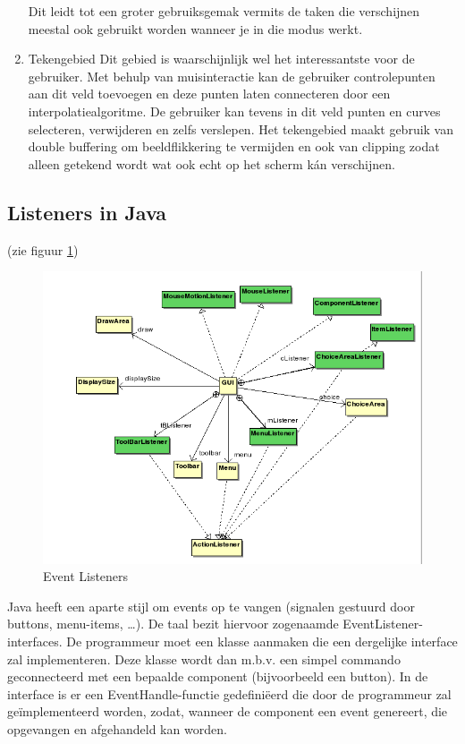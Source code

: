 \documentclass[a4paper,11pt,oneside, titlepage]{article}
\begin{document}
\begin{enumerate}
Dit leidt tot een groter gebruiksgemak vermits de taken die verschijnen meestal ook gebruikt
worden wanneer je in die modus werkt.
\item Tekengebied\newline
Dit gebied is waarschijnlijk wel het interessantste voor de gebruiker. Met behulp van muisinteractie
kan de gebruiker controlepunten aan dit veld toevoegen en deze punten laten connecteren
door een interpolatiealgoritme. De gebruiker kan tevens in dit veld punten en curves selecteren,
verwijderen en zelfs verslepen. Het tekengebied maakt gebruik van double buffering om 
beeldflikkering te vermijden en ook van clipping zodat alleen getekend wordt wat ook echt
op het scherm k\'an verschijnen.
\end{enumerate}
\subsection{Listeners in Java }
(zie figuur \ref{iLis})
\begin{figure}[htbp]
\centering
\includegraphics[scale=0.4]{./UML2/Listeners.png}
\caption{Event Listeners}\label{iLis}
\end{figure}
Java heeft een aparte stijl om events op te vangen (signalen gestuurd door buttons, menu-items,
\ldots). De taal bezit hiervoor zogenaamde EventListener-interfaces. De programmeur
moet een klasse aanmaken die een dergelijke interface zal implementeren. Deze klasse wordt dan
m.b.v. een simpel commando geconnecteerd met een bepaalde component (bijvoorbeeld een button).
In de interface is er een EventHandle-functie gedefini\"eerd die door de programmeur zal 
ge\"implementeerd worden, zodat, wanneer de component een event genereert,
die opgevangen en afgehandeld kan worden.\newline
\end{document}
